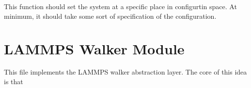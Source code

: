 \documentclass[letterpaper,10pt,english]{sphinxmanual}
\begin{document}
\begin{fulllineitems}
\begin{fulllineitems}
\end{fulllineitems}


\begin{fulllineitems}
\label{src/src.doc:walker.walker.setConfig}
This function should set the system at a specific place in configurtin space.
At minimum, it should take some sort of specification of the configuration.

\end{fulllineitems}


\end{fulllineitems}



\chapter{LAMMPS Walker Module}
\label{src/src.doc:module-lammpsWalker}\label{src/src.doc:lammps-walker-module}
This file implements the LAMMPS walker abstraction layer. The core of this idea is that
\end{document}
